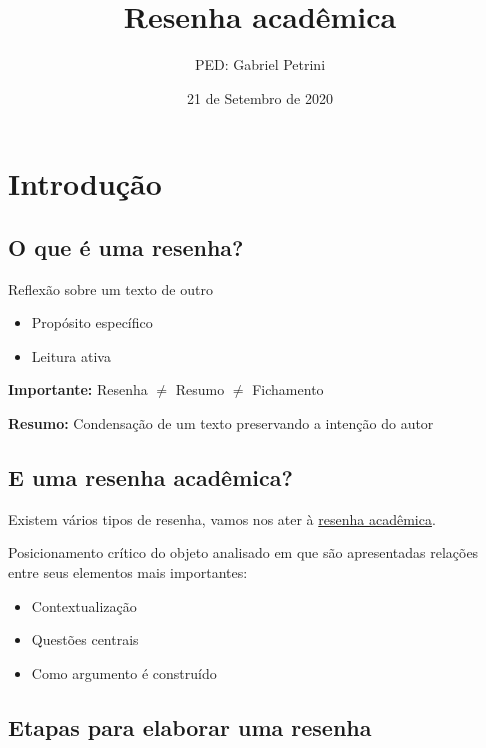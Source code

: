 \documentclass[11pt]{article}
\author{PED: Gabriel Petrini}
\date{21 de Setembro de 2020}
\title{Resenha acadêmica}
\begin{document}
\maketitle
\setcounter{tocdepth}{1}
\tableofcontents


\section*{Introdução}
\label{sec:org8b334d5}

\subsection*{O que é uma resenha?}
\label{sec:orgbed96c1}

Reflexão sobre um texto de outro

\begin{itemize}
\item Propósito específico
\item Leitura ativa
\end{itemize}

\textbf{Importante:} Resenha \(\neq\) Resumo \(\neq\) Fichamento

\begin{NOTES}
\textbf{Resumo:} Condensação de um texto preservando a intenção do autor
\end{NOTES}


\subsection*{E uma resenha acadêmica?}
\label{sec:org6330160}

Existem vários tipos de resenha, vamos nos ater à \uline{resenha acadêmica}.

Posicionamento crítico do objeto analisado em que são apresentadas relações entre seus elementos mais importantes:

\begin{itemize}
\item Contextualização
\item Questões centrais
\item Como argumento é construído
\end{itemize}

\subsection*{Etapas para elaborar uma resenha}
\label{sec:orga2f5406}
\end{document}
